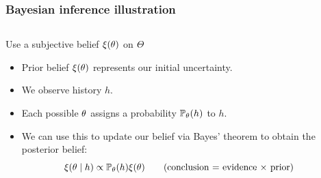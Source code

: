 \begin{frame}
  \frametitle{Bayesian inference illustration}
  \begin{columns}
    \begin{column}{0.7\textwidth}
      \begin{block}{Use a subjective belief $\xi(\theta)$ on $\Theta$}
        \begin{itemize}
        \item<1-> \alert{Prior} belief $\xi(\theta)$ represents our initial uncertainty.
        \item<2-> We \alert{observe history} $h$.
        \item<3->Each possible $\theta$ assigns a \alert{probability} $\mathop{\mbox{\ensuremath{\mathbb{P}}}}\nolimits_\theta(h)$ to $h$.
        \item<4-> We can use this to \alert{update} our belief via Bayes' theorem to obtain the \alert{posterior} belief:
          \[
          \xi(\theta \mid h) \propto \mathop{\mbox{\ensuremath{\mathbb{P}}}}\nolimits_\theta(h) \xi(\theta)
          \tag{conclusion = evidence $\times$ prior}
          \]
        \end{itemize}
      \end{block}
    \end{column}
    \begin{column}{0.3\textwidth}
      \centering
      \\
\end{column}
\end{columns}
\end{frame}

